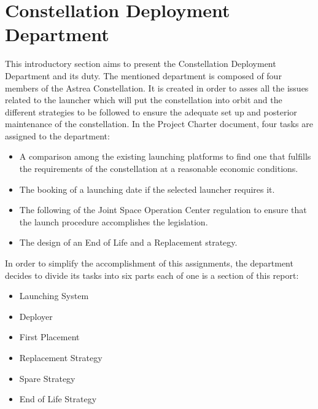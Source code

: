 

\section{Constellation Deployment Department}
This introductory section aims to present the Constellation Deployment Department and its duty. 
\newline
The mentioned department is composed of four members of the Astrea Constellation. It is created in order to asses all the issues related to the launcher which will put the constellation into orbit and the different strategies to be followed to ensure the adequate set up and posterior maintenance of the constellation. 
In the Project Charter document, four tasks are assigned to the department:
\begin{itemize}
\item A comparison among the existing launching platforms to find one that fulfills the requirements of the constellation at a reasonable economic conditions. 
\item The booking of a launching date if the selected launcher requires it.
\item The following of the Joint Space Operation Center regulation to ensure that the launch procedure accomplishes the legislation.
\item The design of an End of Life and a Replacement strategy.
\end{itemize}
In order to simplify the accomplishment of this assignments, the department decides to divide its tasks into six parts each of one is a section of this report:
\begin{itemize}
\item Launching System
\item Deployer
\item First Placement
\item Replacement Strategy
\item Spare Strategy
\item End of Life Strategy
\end{itemize}

